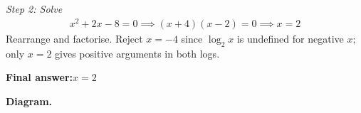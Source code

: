 \documentclass[11pt]{article}
\begin{document}
\textit{Step 2: Solve}
\[\begin{gathered}
x^2 + 2x - 8 = 0 \implies (x+4)(x-2) = 0 \implies x = 2
\end{gathered}\]
Rearrange and factorise. Reject \( x = -4 \) since \( \log_2 x \) is undefined for negative \( x \); only \( x = 2 \) gives positive arguments in both logs.

\begin{answerbox}
\textbf{Final answer:}\quad \(\displaystyle x = 2\)
\end{answerbox}
\textbf{Diagram.}

\begin{center}
\end{center}
\end{document}
